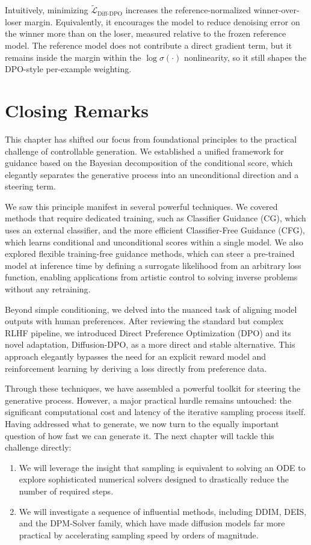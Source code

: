 Intuitively, minimizing $\tilde{\mathcal L}_{\mathrm{Diff\text{-}DPO}}$ increases the reference-normalized winner-over-loser margin. Equivalently, it encourages the model to reduce denoising error on the winner more than on the loser, measured relative to the frozen reference model. The reference model does not contribute a direct gradient term, but it remains inside the margin within the $\log\sigma(\cdot)$ nonlinearity, so it still shapes the DPO-style per-example weighting.


\newpage
\section{Closing Remarks}\label{sec:ch8_cr}

This chapter has shifted our focus from foundational principles to the practical challenge of controllable generation. We established a unified framework for guidance based on the Bayesian decomposition of the conditional score, which elegantly separates the generative process into an unconditional direction and a steering term.

We saw this principle manifest in several powerful techniques. We covered methods that require dedicated training, such as Classifier Guidance (CG), which uses an external classifier, and the more efficient Classifier-Free Guidance (CFG), which learns conditional and unconditional scores within a single model. We also explored flexible training-free guidance methods, which can steer a pre-trained model at inference time by defining a surrogate likelihood from an arbitrary loss function, enabling applications from artistic control to solving inverse problems without any retraining.

Beyond simple conditioning, we delved into the nuanced task of aligning model outputs with human preferences. After reviewing the standard but complex RLHF pipeline, we introduced Direct Preference Optimization (DPO) and its novel adaptation, Diffusion-DPO, as a more direct and stable alternative. This approach elegantly bypasses the need for an explicit reward model and reinforcement learning by deriving a loss directly from preference data.


Through these techniques, we have assembled a powerful toolkit for steering the generative process. However, a major practical hurdle remains untouched: the significant computational cost and latency of the iterative sampling process itself. Having addressed what to generate, we now turn to the equally important question of how fast we can generate it. The next chapter will tackle this challenge directly:
\begin{enumerate}
    \item We will leverage the insight that sampling is equivalent to solving an ODE to explore sophisticated numerical solvers designed to drastically reduce the number of required steps.
    \item We will investigate a sequence of influential methods, including DDIM, DEIS, and the DPM-Solver family, which have made diffusion models far more practical by accelerating sampling speed by orders of magnitude.
\end{enumerate}

